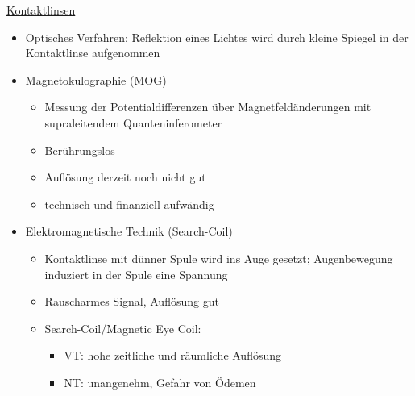 \documentclass[a4paper,10pt,oneside]{article}
\begin{document}
 		
\underline{Kontaktlinsen} \\
	\begin{itemize}
		\item Optisches Verfahren: Reflektion eines Lichtes wird durch kleine Spiegel in der Kontaktlinse aufgenommen
		\item Magnetokulographie (MOG)	
			\begin{itemize}
				\item Messung der Potentialdifferenzen über Magnetfeldänderungen mit supraleitendem Quanteninferometer
				\item Berührungslos
				\item Auflösung derzeit noch nicht gut
				\item technisch und finanziell aufwändig
			\end{itemize}
		\item Elektromagnetische Technik (Search-Coil)
			\begin{itemize}
				\item Kontaktlinse mit dünner Spule wird ins Auge gesetzt; Augenbewegung induziert in der Spule eine Spannung
				\item Rauscharmes Signal, Auflösung gut
				\item Search-Coil/Magnetic Eye Coil:
					\begin{itemize}
						\item VT: hohe zeitliche und räumliche Auflösung
						\item NT: unangenehm, Gefahr von Ödemen 
					\end{itemize}
			\end{itemize}
	\end{itemize}
\end{document}
